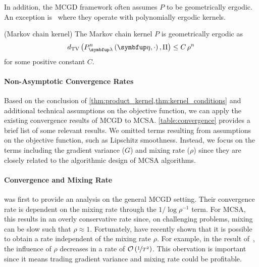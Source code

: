 In addition, the MCGD framework often assumes \(P\) to be geometrically ergodic.
An exception is~\citet{debavelaere_convergence_2021} where they operate with polynomially ergodic kernels.
\begin{assumption}{(Markov chain kernel)}\label{thm:kernel_conditions}
\vspace{-0.05in}
  The Markov chain kernel \(P\) is geometrically ergodic as
  {%
  \[
  \DTV{P_{\vlambda}^{n}\left(\veta, \cdot\right)}{ \Pi } \leq C \, \rho^{n}
  \]
  }
  for some positive constant \(C\).
\end{assumption}
\vspace{-0.05in}

\vspace{-0.1in}
\paragraph{Non-Asymptotic Convergence Rates}
Based on the conclusion of \cref{thm:product_kernel,thm:kernel_conditions} and additional technical assumptions on the objective function, we can apply the existing convergence results of MCGD to MCSA.
\cref{table:convergence} provides a brief list of some relevant results.
We omitted terms resulting from assumptions on the objective function, such as Lipschitz smoothness.
Instead, we focus on the terms including the gradient variance (\(G\)) and mixing rate (\(\rho\)) since they are closely related to the algorithmic design of MCSA algorithms.

\vspace{-0.1in}
\paragraph{Convergence and Mixing Rate}
\citet{duchi_ergodic_2012} was first to provide an analysis on the general MCGD setting.
Their convergence rate is dependent on the mixing rate through the \(1 / \log \rho^{-1}\) term.
For MCSA, this results in an overly conservative rate since, on challenging problems, mixing can be slow such that \(\rho \approx 1\).
Fortunately, \citet{doan_convergence_2020,doan_finitetime_2020} have recently shown that it is possible to obtain a rate independent of the mixing rate \(\rho\).
For example, in the result of~\citet{doan_finitetime_2020}, the influence of \(\rho\) decreases in a rate of \(\mathcal{O}\left(\nicefrac{1}{T^2}\right)\).
This obervation is important since it means trading gradient variance and mixing rate could be profitable.

